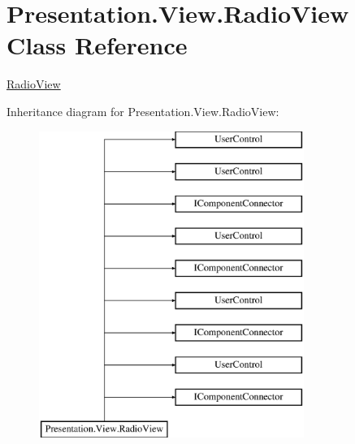 \hypertarget{class_presentation_1_1_view_1_1_radio_view}{}\section{Presentation.\+View.\+Radio\+View Class Reference}
\label{class_presentation_1_1_view_1_1_radio_view}


\hyperlink{class_presentation_1_1_view_1_1_radio_view}{Radio\+View}  


Inheritance diagram for Presentation.\+View.\+Radio\+View\+:\begin{figure}[H]
\begin{center}
\leavevmode
\includegraphics[height=10.000000cm]{class_presentation_1_1_view_1_1_radio_view}
\end{center}
\end{figure}
